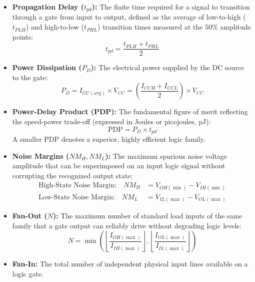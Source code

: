 \documentclass[12pt,a4paper]{article}
\begin{document}
\begin{tcolorbox}[defbox, title={\textbf{Core Figures of Merit for Logic Families}}, title after break={\textbf{Core Figures of Merit for Logic Families (contd.)}}]
\begin{itemize}[leftmargin=*, itemsep=4pt]
  \item \textbf{Propagation Delay ($t_{pd}$):} The finite time required for a signal to transition through a gate from input to output, defined as the average of low-to-high ($t_{PLH}$) and high-to-low ($t_{PHL}$) transition times measured at the $50\%$ amplitude points:
  \begin{equation}
    t_{pd} = \frac{t_{PLH} + t_{PHL}}{2}
  \end{equation}
  \item \textbf{Power Dissipation ($P_D$):} The electrical power supplied by the DC source to the gate:
  \begin{equation}
    P_D = I_{CC(\text{avg})} \times V_{CC} = \left(\frac{I_{CCH} + I_{CCL}}{2}\right) \times V_{CC}
  \end{equation}
  \item \textbf{Power-Delay Product (PDP):} The fundamental figure of merit reflecting the speed-power trade-off (expressed in Joules or picojoules, pJ):
  \begin{equation}
    \text{PDP} = P_D \times t_{pd}
  \end{equation}
  A smaller PDP denotes a superior, highly efficient logic family.

  \item \textbf{Noise Margins ($NM_H, NM_L$):} The maximum spurious noise voltage amplitude that can be superimposed on an input logic signal without corrupting the recognized output state:
  \begin{align}
    \text{High-State Noise Margin:} \quad NM_H &= V_{OH(\min)} - V_{IH(\min)} \\
    \text{Low-State Noise Margin:} \quad NM_L &= V_{IL(\max)} - V_{OL(\max)}
  \end{align}

  \pagebreak

  \item \textbf{Fan-Out ($N$):} The maximum number of standard load inputs of the same family that a gate output can reliably drive without degrading logic levels:
  \begin{equation}
    N = \min\left( \left\lfloor\frac{I_{OH(\max)}}{I_{IH(\max)}}\right\rfloor, \left\lfloor\frac{I_{OL(\max)}}{I_{IL(\max)}}\right\rfloor \right)
  \end{equation}
  \item \textbf{Fan-In:} The total number of independent physical input lines available on a logic gate.
\end{itemize}
\end{tcolorbox}
\end{document}
